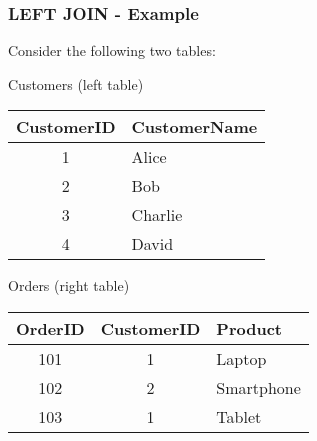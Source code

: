\documentclass[aspectratio=169]{beamer}
\begin{document}
\begin{frame}[fragile]
    \frametitle{LEFT JOIN - Example}
    Consider the following two tables:

    \begin{block}{Customers (left table)}
    \begin{tabular}{|c|l|}
    \hline
    CustomerID & CustomerName \\
    \hline
    1          & Alice         \\
    2          & Bob           \\
    3          & Charlie       \\
    4          & David         \\
    \hline
    \end{tabular}
    \end{block}

    \begin{block}{Orders (right table)}
    \begin{tabular}{|c|c|l|}
    \hline
    OrderID & CustomerID & Product     \\
    \hline
    101     & 1          & Laptop      \\
    102     & 2          & Smartphone   \\
    103     & 1          & Tablet      \\
    \hline
    \end{tabular}
    \end{block}
\end{frame}
\end{document}
